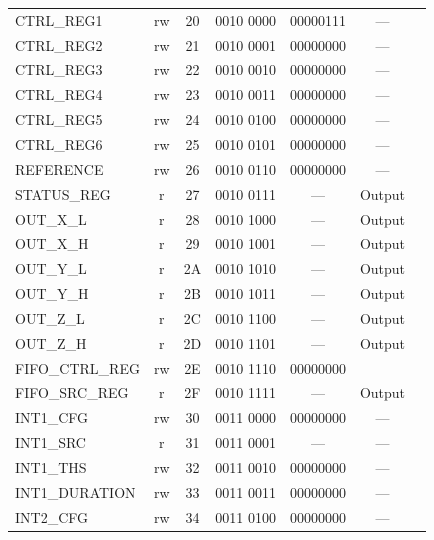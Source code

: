 \begin{table}[H]
\begin{tabular}{l c c c c c l}
        CTRL\_REG1          & rw    & 20    & 0010 0000  & 00000111  & —         \\
        CTRL\_REG2          & rw    & 21    & 0010 0001  & 00000000  & —         \\
        CTRL\_REG3          & rw    & 22    & 0010 0010  & 00000000  & —         \\
        CTRL\_REG4          & rw    & 23    & 0010 0011  & 00000000  & —         \\
        CTRL\_REG5          & rw    & 24    & 0010 0100  & 00000000  & —         \\
        CTRL\_REG6          & rw    & 25    & 0010 0101  & 00000000  & —         \\
        REFERENCE           & rw    & 26    & 0010 0110  & 00000000  & —         \\
        STATUS\_REG         & r     & 27    & 0010 0111  & —         & Output    \\
        OUT\_X\_L           & r     & 28    & 0010 1000  & —         & Output    \\
        OUT\_X\_H           & r     & 29    & 0010 1001  & —         & Output    \\
        OUT\_Y\_L           & r     & 2A    & 0010 1010  & —         & Output    \\
        OUT\_Y\_H           & r     & 2B    & 0010 1011  & —         & Output    \\
        OUT\_Z\_L           & r     & 2C    & 0010 1100  & —         & Output    \\
        OUT\_Z\_H           & r     & 2D    & 0010 1101  & —         & Output    \\
        FIFO\_CTRL\_REG     & rw    & 2E    & 0010 1110  & 00000000  &           \\
        FIFO\_SRC\_REG      & r     & 2F    & 0010 1111  & —         & Output    \\
        INT1\_CFG           & rw    & 30    & 0011 0000  & 00000000  & —         \\
        INT1\_SRC           & r     & 31    & 0011 0001  & —         & —         \\
        INT1\_THS           & rw    & 32    & 0011 0010  & 00000000  & —         \\
        INT1\_DURATION      & rw    & 33    & 0011 0011  & 00000000  & —         \\
        INT2\_CFG           & rw    & 34    & 0011 0100  & 00000000  & —         \\

\end{tabular}
\end{table}
